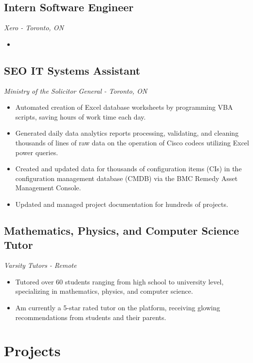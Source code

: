 \documentclass[10pt, a4paper]{article}
\begin{document}
\subsection*{Intern Software Engineer \hfill {}}
\textit{Xero - Toronto, ON}
\begin{itemize}
    \item 
\end{itemize}

\subsection*{SEO IT Systems Assistant \hfill {}}
\textit{Ministry of the Solicitor General - Toronto, ON}
\begin{itemize}
    \item Automated creation of Excel database worksheets by programming VBA scripts, saving hours of work time each day.
    \item Generated daily data analytics reports processing, validating, and cleaning thousands of lines of raw data on the operation of Cisco codecs utilizing Excel power queries.
    \item Created and updated data for thousands of configuration items (CIs) in the configuration management database (CMDB) via the BMC Remedy Asset Management Console.
    \item Updated and managed project documentation for hundreds of projects.
\end{itemize}

\subsection*{Mathematics, Physics, and Computer Science Tutor \hfill {}}
\textit{Varsity Tutors - Remote}
\begin{itemize}
    \item Tutored over 60 students ranging from high school to university level, specializing in mathematics, physics, and computer science.
    \item Am currently a 5-star rated tutor on the platform, receiving glowing recommendations from students and their parents.
\end{itemize}

\section*{Projects}
\end{document}
